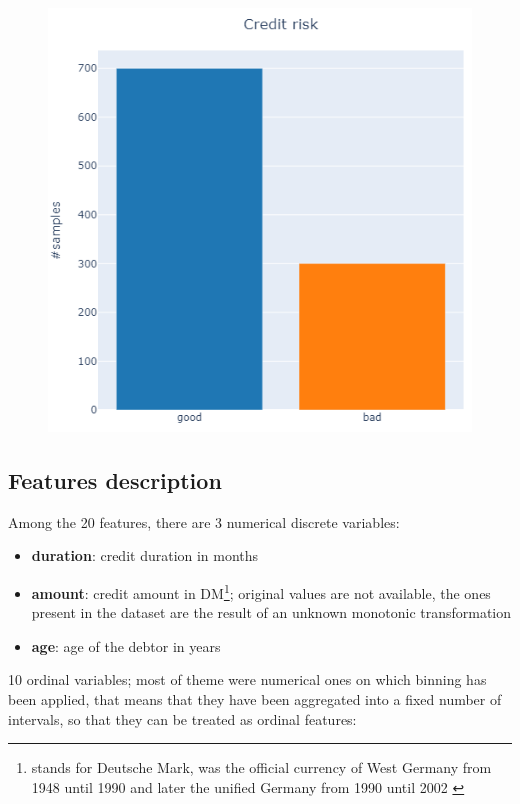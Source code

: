 \documentclass[letterpaper]{article}
\begin{document}
	\begin{figure}[h]
		\centering
		\includegraphics[width=.35\textwidth]{images/class.png}
		\label{fig:1}
		
	\end{figure}
	
	\subsection{Features description}
	Among the 20 features, there are 3 numerical discrete variables:
	\begin{itemize}
		\item \textbf{duration}: credit duration in months
		\item \textbf{amount}: credit amount in DM\footnote{stands for Deutsche Mark, was the official currency of West Germany from 1948 until 1990 and later the unified Germany from 1990 until 2002 \cite{dm}}; original values are not available, the ones present in the dataset are the result of an unknown monotonic transformation
		\item \textbf{age}: age of the debtor in years
	\end{itemize}
	10 ordinal variables; most of theme were numerical ones on which binning has been applied, that means that they have been aggregated into a fixed number of intervals, so that they can be treated as ordinal features:
\end{document}
